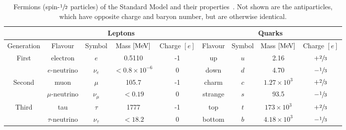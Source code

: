 \begin{table}[h]
	\centering
	\caption{Fermions (spin-$\sfrac{1}{2}$ particles) of the Standard Model and their properties~\cite{ParticleDataGroup}. Not shown are the antiparticles, which have opposite charge and baryon number, but are otherwise identical.}
	\begin{adjustbox}{max width=\textwidth}
		\label{tab:fermions}
		\renewcommand{\arraystretch}{1.5}
		\begin{tabular}{c|cccc|cccc}
			\toprule
			\hline
			                        & \multicolumn{4}{c}{Leptons} & \multicolumn{4}{|c}{Quarks}                                                                                                   \\
			\hline
			Generation              & Flavour                     & Symbol                      & Mass $[\MeV]$          & Charge $[e]$ & Flavour & Symbol & Mass $[\MeV]$      & Charge $[e]$    \\
			\hline
			\multirow{2}{*}{First}  & electron                    & $e$                         & 0.5110                 & -1           & up      & $u$    & 2.16               & $+\sfrac{2}{3}$ \\
			                        & $e$-neutrino                & $\nu_e$                     & $< 0.8 \times 10^{-6}$ & 0            & down    & $d$    & 4.70               & $-\sfrac{1}{3}$ \\
			\hline
			\multirow{2}{*}{Second} & muon                        & $\mu$                       & 105.7                  & -1           & charm   & $c$    & $1.27 \times 10^3$ & $+\sfrac{2}{3}$ \\
			                        & $\mu$-neutrino              & $\nu_\mu$                   & $< 0.19$               & 0            & strange & $s$    & 93.5               & $-\sfrac{1}{3}$ \\
			\hline
			\multirow{2}{*}{Third}  & tau                         & $\tau$                      & 1777                   & -1           & top     & $t$    & $173 \times 10^3$  & $+\sfrac{2}{3}$ \\
			                        & $\tau$-neutrino             & $\nu_\tau$                  & $< 18.2$               & 0            & bottom  & $b$    & $4.18 \times 10^3$ & $-\sfrac{1}{3}$ \\
			\hline
		\end{tabular}
	\end{adjustbox}
\end{table}

